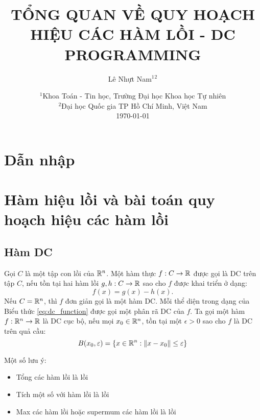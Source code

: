 \documentclass[a4paper]{report}
\title{TỔNG QUAN VỀ QUY HOẠCH HIỆU CÁC HÀM LỒI - DC PROGRAMMING}
\author{Lê Nhựt Nam$^1$$^2$}
\date{
    $^1$Khoa Toán - Tin học, Trường Đại học Khoa học Tự nhiên\\%
    $^2$Đại học Quốc gia TP Hồ Chí Minh, Việt Nam\\%
    \vfill
    \today
}
\begin{document}
    \maketitle
    \tableofcontents
    
    \chapter{Dẫn nhập}

    \chapter{Hàm hiệu lồi và bài toán quy hoạch hiệu các hàm lồi}

    \section{Hàm DC}
    \label{sec:dc_functions}

    \begin{definition}
        \label{def:dc_function}
        Gọi $C$ là một tập con lồi của $\mathbb{R}^n$. Một hàm thực $f: C \rightarrow \mathbb{R}$ được gọi là DC trên tập $C$, nếu tồn tại hai hàm lồi $g, h: C \rightarrow \mathbb{R}$ sao cho $f$ được khai triển ở dạng:
        \begin{equation}
            \label{eq:dc_function}
            f(x) = g(x) - h(x).
        \end{equation}
        Nếu $C = \mathbb{R}^n$, thì $f$ đơn giản gọi là một hàm DC. Mỗi thể diện trong dạng của Biểu thức \ref{eq:dc_function} được gọi một phân rã DC của $f$. Ta gọi một hàm $f: \mathbb{R}^n \rightarrow \mathbb{R}$ là DC cục bộ, nếu mọi $x_0 \in \mathbb{R}^n$, tồn tại một $\epsilon >0$ sao cho $f$ là DC trên quả cầu:
        \begin{equation}
            B(x_0, \varepsilon) = \{x \in \mathbb{R}^n: \| x - x_0\| \leq \varepsilon\}
        \end{equation}
    \end{definition}

    \begin{remark}
        Một số lưu ý:
        \begin{itemize}
            \item Tổng các hàm lồi là lồi 
            \item Tích một số với hàm lồi là lồi 
            \item Max các hàm lồi hoặc supermum các hàm lồi là lồi
        \end{itemize}
    \end{remark}
\end{document}
